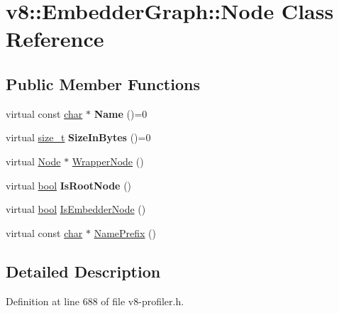 \hypertarget{classv8_1_1EmbedderGraph_1_1Node}{}\section{v8\+:\+:Embedder\+Graph\+:\+:Node Class Reference}
\label{classv8_1_1EmbedderGraph_1_1Node}
\subsection*{Public Member Functions}
\begin{DoxyCompactItemize}
\item 
\mbox{\label{classv8_1_1EmbedderGraph_1_1Node_af07ffa90f03e52bf53e58ab512c2e1fe}} 
virtual const \mbox{\hyperlink{classchar}{char}} $\ast$ {\bfseries Name} ()=0
\item 
\mbox{\label{classv8_1_1EmbedderGraph_1_1Node_a47fa609f09f06eb6f9dac80e46fcbe10}} 
virtual \mbox{\hyperlink{classsize__t}{size\+\_\+t}} {\bfseries Size\+In\+Bytes} ()=0
\item 
virtual \mbox{\hyperlink{classv8_1_1EmbedderGraph_1_1Node}{Node}} $\ast$ \mbox{\hyperlink{classv8_1_1EmbedderGraph_1_1Node_acfe58e3b4db90c2ebbfcee5f81415181}{Wrapper\+Node}} ()
\item 
\mbox{\label{classv8_1_1EmbedderGraph_1_1Node_ad1ebb9298b7fcac73c55e693e028a501}} 
virtual \mbox{\hyperlink{classbool}{bool}} {\bfseries Is\+Root\+Node} ()
\item 
virtual \mbox{\hyperlink{classbool}{bool}} \mbox{\hyperlink{classv8_1_1EmbedderGraph_1_1Node_a62a22058ec311d7e9b6ac8ec061967af}{Is\+Embedder\+Node}} ()
\item 
virtual const \mbox{\hyperlink{classchar}{char}} $\ast$ \mbox{\hyperlink{classv8_1_1EmbedderGraph_1_1Node_a2c4c64b2c3eab48dcdc587aec8734ee8}{Name\+Prefix}} ()
\end{DoxyCompactItemize}


\subsection{Detailed Description}


Definition at line 688 of file v8-\/profiler.\+h.



